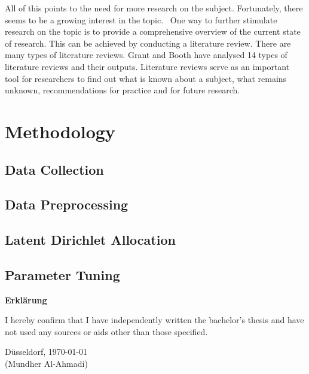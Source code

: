 \documentclass[12pt,english,titlepage,a4paper]{article}
\begin{document}
\bigskip

All of this points to the need for more research on the subject. Fortunately, there seems to be a growing interest in the topic.~\cite{horesearch} One way to further stimulate research on the topic is to provide a comprehensive overview of the current state of research. This can be achieved by conducting a literature review. There are many types of literature reviews. Grant and Booth have analysed 14 types of literature reviews and their outputs. Literature reviews serve as an important tool for researchers to find out what is known about a subject, what remains unknown, recommendations for practice and for future research.~\cite{grant2009typology}



\pagebreak


\section{Methodology}

\subsection{Data Collection}

\subsection{Data Preprocessing}

\subsection{Latent Dirichlet Allocation}

\subsection{Parameter Tuning}



\pagebreak





\pagebreak\noindent
\textbf{\LARGE Erkl\"arung}

\bigskip\bigskip
\noindent 
I hereby confirm that I have independently written the 
bachelor's thesis and have not used any sources or aids 
other than those specified.
\bigskip
\noindent

\bigskip\bigskip\bigskip
\noindent
D\"usseldorf, \today \\
(Mundher Al-Ahmadi)

% 
\end{document}
